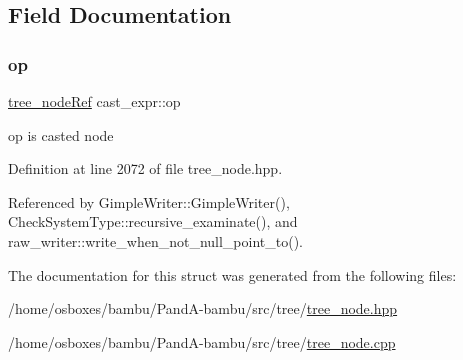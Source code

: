 \subsection{Field Documentation}
\mbox{\label{structcast__expr_a8dc715dac26ea43a7d5e457ceaac5a6f}} 
\subsubsection{\texorpdfstring{op}{op}}
{\footnotesize\ttfamily \hyperlink{tree__node_8hpp_a6ee377554d1c4871ad66a337eaa67fd5}{tree\+\_\+node\+Ref} cast\+\_\+expr\+::op}



op is casted node 



Definition at line 2072 of file tree\+\_\+node.\+hpp.



Referenced by Gimple\+Writer\+::\+Gimple\+Writer(), Check\+System\+Type\+::recursive\+\_\+examinate(), and raw\+\_\+writer\+::write\+\_\+when\+\_\+not\+\_\+null\+\_\+point\+\_\+to().



The documentation for this struct was generated from the following files\+:\begin{DoxyCompactItemize}
\item 
/home/osboxes/bambu/\+Pand\+A-\/bambu/src/tree/\hyperlink{tree__node_8hpp}{tree\+\_\+node.\+hpp}\item 
/home/osboxes/bambu/\+Pand\+A-\/bambu/src/tree/\hyperlink{tree__node_8cpp}{tree\+\_\+node.\+cpp}\end{DoxyCompactItemize}

